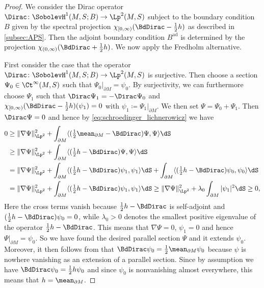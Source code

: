\documentclass[a4paper,11pt]{amsart}
\numberwithin{equation}{section}
\begin{document}
\begin{proof}
   
    We consider the Dirac operator \(\Dirac \colon \SobolevH^1(M,S; B) \to \Lp^2(M,S)\) subject to the boundary condition \(B\) given by the spectral projection \(\chi_{[0,\infty)}(\BdDirac - \frac{1}{2} h)\) as described in \cref{subsec:APS}.
    Then the adjoint boundary condition \(B^{\mathrm{ad}}\) is determined by the projection \(\chi_{(0,\infty)}(\BdDirac + \frac{1}{2} h)\).
    We now apply the Fredholm alternative.
    
  
  First consider the case that the operator \(\Dirac \colon \SobolevH^1(M,S; B) \to \Lp^2(M,S)\) is surjective.
  Then choose a section \(\Psi_0 \in \Ct^\infty(M,S)\) such that \(\Psi_0|_{\partial M} = \psi_0\).
 By surjectivity, we can furthermore choose \(\Psi_1\) such that \(\Dirac \Psi_1 = - \Dirac \Psi_0\) and \(\chi_{[0,\infty)}(\BdDirac - \frac{1}{2} h)(\psi_1) = 0\) with \(\psi_1 \coloneqq {\Psi_1}|_{\partial M}\).
 We then set \(\Psi = \Psi_0 + \Psi_1\). Then \(\Dirac \Psi = 0\) and hence by \eqref{eq:schroedinger_lichnerowicz} we have
 \begin{align*}
  0 &\geq \|\nabla \Psi\|^2_{\Lp^2} + \int_{\partial M} \langle (\tfrac{1}{2} \mean_{\partial M} - \BdDirac) \Psi, \Psi \rangle \dS \\
  &\geq \|\nabla \Psi\|^2_{\Lp^2} + \int_{\partial M} \langle (\tfrac{1}{2} h - \BdDirac) \Psi, \Psi \rangle \dS \\
  &= \|\nabla \Psi\|^2_{\Lp^2} + \int_{\partial M} \langle (\tfrac{1}{2} h - \BdDirac) \psi_1, \psi_1 \rangle \dS + \int_{\partial M} \langle (\tfrac{1}{2} h - \BdDirac) \psi_0, \psi_0 \rangle \dS \\
  &= \|\nabla \Psi\|^2_{\Lp^2} + \int_{\partial M} \langle (\tfrac{1}{2} h - \BdDirac) \psi_1, \psi_1 \rangle \dS \geq \|\nabla \Psi\|^2_{\Lp^2} + \lambda_0 \int_{\partial M} |\psi_1|^2 \dS \geq 0,
 \end{align*}
 Here the cross terms vanish because \(\frac{1}{2} h - \BdDirac\) is self-adjoint and \((\frac{1}{2} h - \BdDirac)\psi_0 = 0\), while \(\lambda_0 > 0\) denotes the smallest positive eigenvalue of the operator \(\tfrac{1}{2} h - \BdDirac\).
 This means that \(\nabla \Psi = 0\), \(\psi_1 = 0\) and hence \(\Psi|_{\partial M} = \psi_0\).
 So we have found the desired parallel section \(\Psi\) and it extends \(\psi_0\).
 Moreover, it then follows from  that \(\BdDirac \psi_0 = \frac{1}{2} \mean_{\partial M} \psi_0\) because \(\psi\) is nowhere vanishing as an extension of a parallel section.
 Since by assumption we have \(\BdDirac \psi_0 = \frac{1}{2} h \psi_0\) and since $\psi_0$ is nonvanishing almost everywhere, this means that \(h = \mean_{\partial M}\).
 

\end{proof}
\end{document}
